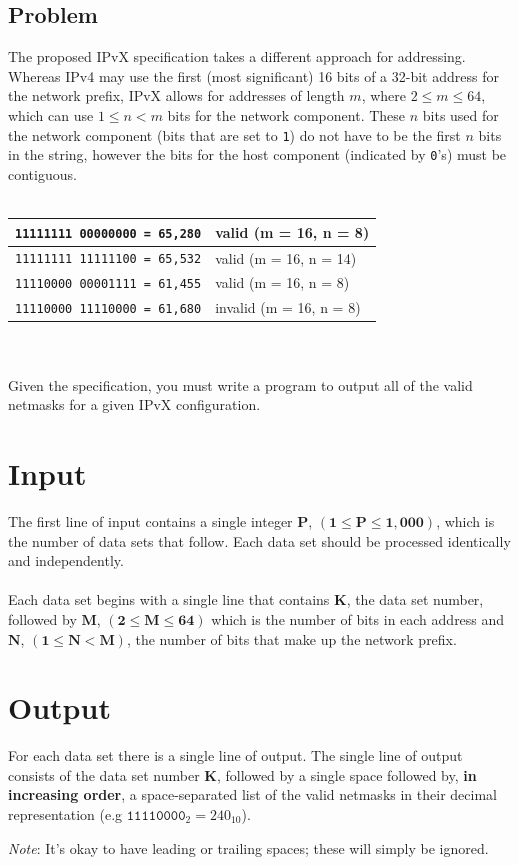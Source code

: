 \documentclass[11pt]{article}
\begin{document}
\subsection{Problem}
The proposed IPvX specification takes a different approach for addressing. Whereas IPv4 may use the first (most significant) 16 bits of a 32-bit address for the network prefix, IPvX allows for addresses of length $m$, where $2 \le m \le 64$, which can use $1 \le n < m$ bits for the network component. These $n$ bits used for the network component (bits that are set to \texttt{1}) do not have to be the first $n$ bits in the string, however the bits for the host component (indicated by \texttt{0}'s) must be contiguous.
\\\\ 
\begin{tabularx}{\textwidth}{|X|X|}
	\hline
	\texttt{11111111 00000000 = 65,280} & valid (m = 16, n = 8)\\ \hline
	\texttt{11111111 11111100 = 65,532} & valid (m = 16, n = 14)\\ \hline
	\texttt{11110000 00001111 = 61,455} & valid (m = 16, n = 8)\\ \hline
	\texttt{11110000 11110000 = 61,680} & invalid (m = 16, n = 8)\\ \hline
\end{tabularx}
\\\\
Given the specification, you must write a program to output all of the valid netmasks for a given IPvX configuration.

\section{Input}
The first line of input contains a single integer $\boldsymbol{P}$, $(\boldsymbol{1} \le \boldsymbol{P} \le \boldsymbol{1,000})$, which is the number of data sets that follow. Each
data set should be processed identically and independently.
\\\\
Each data set begins with a single line that contains $\boldsymbol{K}$, the data
set number, followed by $\boldsymbol{M}$, $(\boldsymbol{2} \le \boldsymbol{M} \le \boldsymbol{64})$
which is the number of bits in each address and  $\boldsymbol{N}$,
$(\boldsymbol{1} \le \boldsymbol{N} < \boldsymbol{M})$, the number of bits that make up the network prefix.

\section{Output}
For each data set there is a single line of output. The single line of output
consists of the data set number $\boldsymbol{K}$, followed by a single space
followed by, \textbf{in increasing order}, a space-separated list of the valid netmasks
in their decimal representation (e.g $\texttt{11110000}_2 = 240_{10}$).
\begin{center}\emph{Note}: It's okay to have leading or trailing spaces; these will simply be ignored.\end{center}
\end{document}
